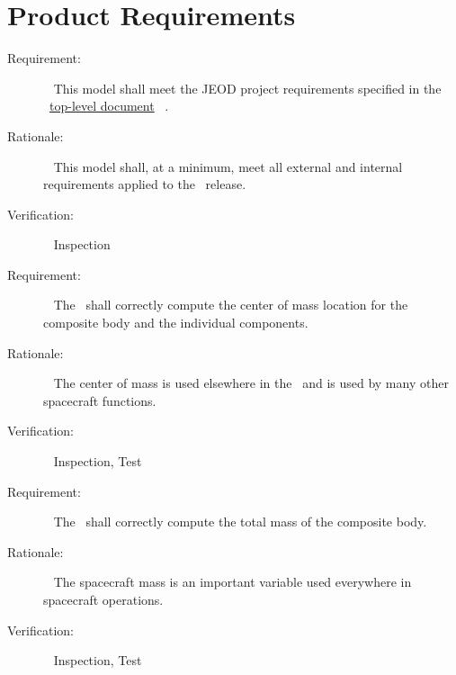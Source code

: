 \chapter{Product Requirements}\label{ch:reqt}
\label{reqt:jeod}
  \begin{description}
  \item[Requirement:]\ \newline
  This model shall meet the JEOD project requirements specified in the \JEODid\
  \hyperref{file:\JEODHOME/docs/JEOD.pdf}{part1}{reqt}{top-level document}~\cite{dynenv:JEOD} .
  \item[Rationale:]\ \newline
  This model shall, at a minimum, meet all external and internal requirements applied to the
  \JEODid\ release.
  \item[Verification:]\ \newline
  Inspection
  \end{description}

\label{reqt:CoM_location}
\begin{description}
  \item[Requirement:]\ \newline
     The \ModelDesc\ shall correctly compute the center of mass location for
     the composite body and the individual components.
  \item[Rationale:]\ \newline
     The center of mass is used elsewhere in the \ModelDesc\ and is used by
     many other spacecraft functions.
  \item[Verification:]\ \newline
    Inspection, Test
\end{description}

\label{reqt:composite_mass}
\begin{description}
  \item[Requirement:]\ \newline
     The \ModelDesc\ shall correctly compute the total mass of the composite
     body.
  \item[Rationale:]\ \newline
     The spacecraft mass is an important variable used everywhere in
     spacecraft operations.
  \item[Verification:]\ \newline
    Inspection, Test
\end{description}

